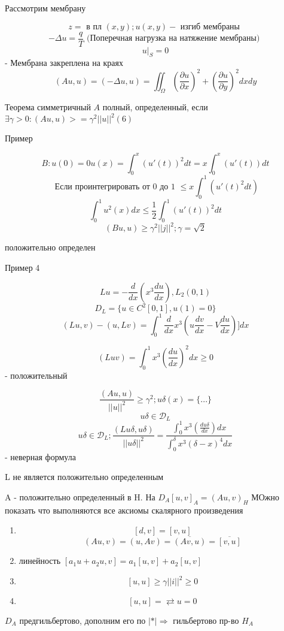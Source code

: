 \documentclass[12pt, a4paper]{article}
\begin{document}
Рассмотрим мембрану

\[ z = \textrm{ в пл } (x,y); u(x,y) -\textrm{ изгиб мембраны } \]
\[ - \Delta u = \frac{q}{T}\textrm{ (Поперечная нагрузка на натяжение мембраны) } \]
\[ u|_S = 0 \] - Мембрана закреплена на краях
\[ (A u , u) = (- \Delta u , u) = \iint_{\Omega} (\frac{\partial u }{\partial x })^2 + (\frac{ \partial u }{\partial y })^2 dx dy \]

Теорема 
симметричный $ A $ полный, определенный, если $ \exists \gamma > 0 : (Au, u) >= \gamma^2 {||u||}^2 (6)$

Пример

\[ B: u(0) = 0 u(x) = \int_{0}^{x } (u'(t))^2 dt = x\int_{0}^{x } (u'(t)) dt \]
\[ \textrm{ Если проинтегрировать от 0 до 1 } \leq x \int_{0}^{1} (u'(t)^2 dt) \]
\[ \int_{0}^{1} u^2 (x) dx \leq \frac{1}{2} \int_{0}^{1}(u'(t))^2 dt \]
\[ (Bu, u) \geq \gamma^2 ||j||^2; \gamma = \sqrt{2} \]

положительно определен

Пример 4 

\[ Lu = - \frac{d }{ d x } (x^3 \frac{du}{dx}), L_2 (0,1) \]
\[ D_L = \{u \in C^2[0,1], u(1) = 0 \} \]
\[(Lu, v) - (u, Lv) = \int_{0}^{1} \frac{d}{dx } x^3 (u \frac{dv }{dx }- V \frac{du }{dx })] dx \]

\[ (Lu v) = \int_{0}^{1} x^3 (\frac{du }{dx })^2 dx \geq 0 \] - положительный

\[ \frac{(Au, u)}{||u||^2} \geq \gamma^2; u\delta (x) = \{ ... \} \]
\[ u\delta \in \mathcal{D}_L  \]
\[ u\delta \in \mathcal{D}_L; \frac{(Lu\delta , u\delta)}{||u\delta||^2}  = \frac{\int_{0}^{1} x^3 (\frac{du \delta}{dx}) dx}{\int_{0}^{\delta} x^3 (\delta -x)^4 dx}\] - неверная формула

L не является положительно определенным

A - положительно определенный в H. На $ D_A [u, v]_A = {(A u, v)}_H$ 
МОжно показать что выполняются все аксиомы скалярного произведения

\begin{enumerate}
	\item \[ [d, v] = [v, u] \]
\[ (Au, v) = (u, Av) = \overline{(Av, u)} = \overline{[v, u]} \]
	\item линейность $ [a_1 u + a_2 u, v] = a_1[u, v] + a_2[u, v]$
	\item \[ [u, u] \geq \gamma ||i||^2 \geq 0 \]
	\item \[ [u, u] = \rightleftarrows u = 0 \]
\end{enumerate}

$ D_A $ предгильбертово, дополним его по $ |*| \Rightarrow $ гильбертово пр-во $ H_A $ 
\end{document}
